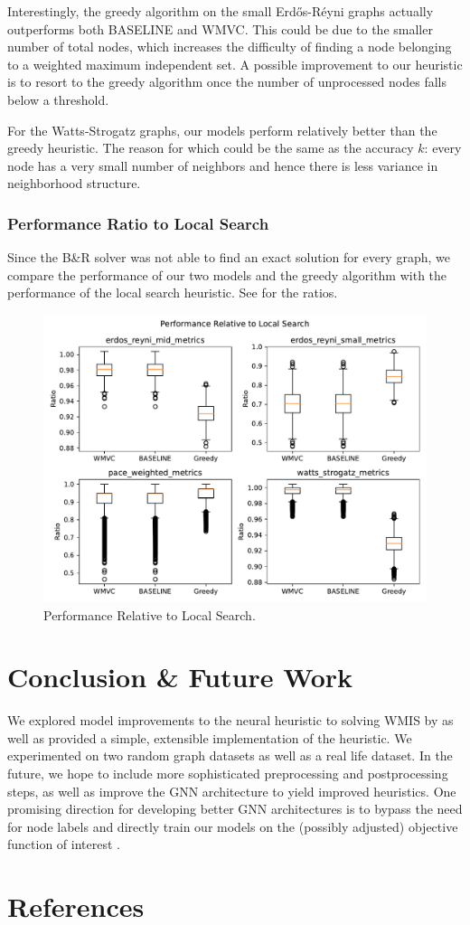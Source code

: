 \documentclass{article}
\begin{document}
Interestingly,
the greedy algorithm on the small Erd\H os-R\'eyni graphs actually outperforms both BASELINE and WMVC.
This could be due to the smaller number of total nodes,
which increases the difficulty of finding a node belonging to a weighted maximum independent set.
A possible improvement to our heuristic is to resort to the greedy algorithm once the number of unprocessed nodes falls below a threshold.

For the Watts-Strogatz graphs,
our models perform relatively better than the greedy heuristic.
The reason for which could be the same as the accuracy $k$:
every node has a very small number of neighbors
and hence there is less variance in neighborhood structure.

\subsubsection{Performance Ratio to Local Search}
Since the B\&R solver was not able to find an exact solution for every graph,
we compare the performance of our two models and the greedy algorithm
with the performance of the local search heuristic.
See  for the ratios.

\begin{figure}
     \centering
     \includegraphics[width=\textwidth]{figures/local_search}
     \caption{Performance Relative to Local Search.}
     \label{fig:local_search}
\end{figure}

\section{Conclusion \& Future Work}\label{sec:conclusion}
We explored model improvements to the neural heuristic to solving WMIS by \citet{langedal_et_al}
as well as provided a simple,
extensible implementation of the heuristic.
We experimented on two random graph datasets
as well as a real life dataset.
In the future,
we hope to include more sophisticated preprocessing and postprocessing steps,
as well as improve the GNN architecture to yield improved heuristics.
One promising direction for developing better GNN architectures
is to bypass the need for node labels
and directly train our models on the (possibly adjusted) objective function of interest \citet{karalias2022neural}.

\section{References}


\end{document}
